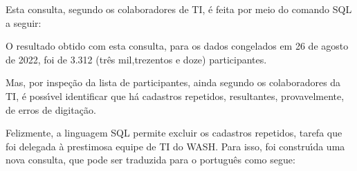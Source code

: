 \documentclass[
12pt,		%
openright,	%
twoside,  %
a4paper,			%
chapter=TITLE,		%
english,			%
french,				%
spanish,			%
brazil				%
]{USPSC-classe/USPSC}
\begin{document}
Esta consulta, segundo os colaboradores de TI, \'e feita por meio do comando SQL a seguir:











\noindent\begin{center}\mbox{\centering{}}\end{center}













O resultado obtido com esta consulta, para os dados congelados em 26 de agosto de 2022, foi de 3.312 (tr\^es mil,trezentos e doze) participantes.










Mas, por inspe\c{c}\~ao da lista de participantes, ainda segundo os colaboradores da TI, \'e poss\'{\i}vel identificar que h\'a cadastros repetidos, resultantes, provavelmente, de erros de digita\c{c}\~ao.










Felizmente, a linguagem SQL permite excluir os cadastros repetidos, tarefa que foi delegada \`a prestimosa equipe de TI do WASH. Para isso, foi constru\'{\i}da uma nova consulta, que pode ser traduzida para o portugu\^es como segue:











\noindent\begin{center}\mbox{\centering{}}\end{center}
\end{document}
